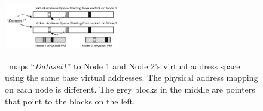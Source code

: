{
\begin{figure}[th]
\begin{center}
\centerline{\includegraphics[width=0.45\textwidth]{Figures/addressing.pdf}}
\vspace{-0.1in}
{
\hotpot\ maps ``{\em Dataset1}'' to Node 1 and Node 2's virtual address space using the 
same base virtual addresses. The physical address mapping on each node is different.
The grey blocks in the middle are pointers that point to the blocks on the left. 
}
\end{center}
\end{figure}
}
